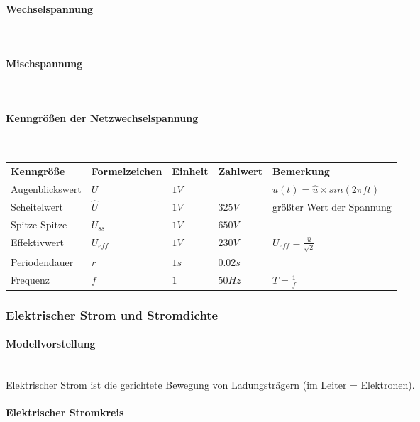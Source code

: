 		\paragraph{Wechselspannung}~\\
		\paragraph{Mischspannung}~\\
		\paragraph{Kenngrößen der Netzwechselspannung}~\\
		
\begin{tabular}{lllll}
{\bf Kenngröße}	& {\bf Formelzeichen}	& {\bf Einheit} & {\bf Zahlwert} & {\bf Bemerkung}\\ 
Augenblickswert	& $U$ 					& $1V$	& & $u(t)=\hat{u}\times sin(2\pi f t)$\\
Scheitelwert		& $\widehat{U}$			& $1V$	& $325V$		& größter Wert der Spannung\\
Spitze-Spitze	& $U_{ss}$				& $1V$	& $650V$		& \\
Effektivwert		& $U_{eff}$				& $1V$	& $230V$		& $U_{eff}=\frac{\hat{u}}{\sqrt{2}}$\\
Periodendauer	& $r$					& $1s$	& $0.02s$	& \\
Frequenz			& $f$					& $1$	& $50 Hz$	& $T = \frac{1}{f}$ \\
\end{tabular}		
		
	\subsubsection{Elektrischer Strom und Stromdichte}
		\paragraph{Modellvorstellung}~\\

\noindent Elektrischer Strom ist die gerichtete Bewegung von Ladungsträgern (im Leiter = Elektronen).

		\paragraph{Elektrischer Stromkreis}~\\
		
